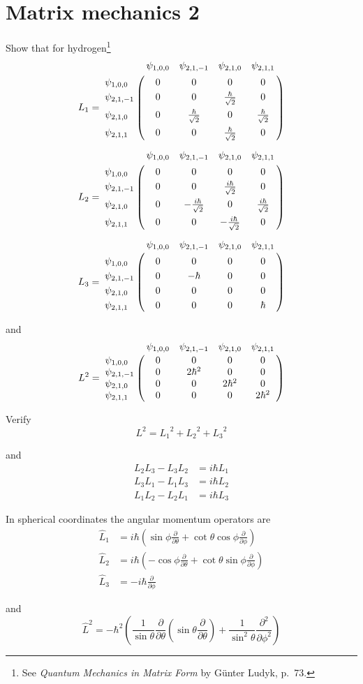 

\section*{Matrix mechanics 2}

Show that for hydrogen\footnote
{See {\it Quantum Mechanics in Matrix Form} by G\"unter Ludyk, p.~73.}
\begin{align*}
L_1&=
\bordermatrix{
& \psi_{1,0,0} & \psi_{2,1,-1} & \psi_{2,1,0} & \psi_{2,1,1} \cr
\psi_{1,0,0} & 0 & 0 & 0 & 0 \cr
\psi_{2,1,-1} & 0 & 0 & \frac{\hbar}{\sqrt2} & 0 \cr
\psi_{2,1,0} & 0 & \frac{\hbar}{\sqrt2} & 0 & \frac{\hbar}{\sqrt2} \cr
\psi_{2,1,1} & 0 & 0 & \frac{\hbar}{\sqrt2} & 0
}
\\[1ex]
L_2&=
\bordermatrix{
& \psi_{1,0,0} & \psi_{2,1,-1} & \psi_{2,1,0} & \psi_{2,1,1} \cr
\psi_{1,0,0} & 0 & 0 & 0 & 0 \cr
\psi_{2,1,-1} & 0 & 0 & \frac{i\hbar}{\sqrt2} & 0 \cr
\psi_{2,1,0} & 0 & -\frac{i\hbar}{\sqrt2} & 0 & \frac{i\hbar}{\sqrt2} \cr
\psi_{2,1,1} & 0 & 0 & -\frac{i\hbar}{\sqrt2} & 0
}
\\[1ex]
L_3&=
\bordermatrix{
& \psi_{1,0,0} & \psi_{2,1,-1} & \psi_{2,1,0} & \psi_{2,1,1} \cr
\psi_{1,0,0} & 0 & 0 & 0 & 0 \cr
\psi_{2,1,-1} & 0 & -\hbar & 0 & 0 \cr
\psi_{2,1,0} & 0 & 0 & 0 & 0 \cr
\psi_{2,1,1} & 0 & 0 & 0 & \hbar
}
\end{align*}

and
\begin{equation*}
L^2=
\bordermatrix{
& \psi_{1,0,0} & \psi_{2,1,-1} & \psi_{2,1,0} & \psi_{2,1,1} \cr
\psi_{1,0,0} & 0 & 0 & 0 & 0 \cr
\psi_{2,1,-1} & 0 & 2\hbar^2 & 0 & 0 \cr
\psi_{2,1,0} & 0 & 0 & 2\hbar^2 & 0 \cr
\psi_{2,1,1} & 0 & 0 & 0 & 2\hbar^2
}
\end{equation*}

Verify
\begin{equation*}
L^2={L_1}^2+{L_2}^2+{L_3}^2
\end{equation*}

and
\begin{align*}
L_2L_3-L_3L_2&=i\hbar L_1
\\
L_3L_1-L_1L_3&=i\hbar L_2
\\
L_1L_2-L_2L_1&=i\hbar L_3
\end{align*}

In spherical coordinates the angular momentum operators are
\begin{align*}
\hat L_1&=i\hbar\left(\sin\phi\frac{\partial}{\partial\theta}
+\cot\theta\cos\phi\frac{\partial}{\partial\phi}\right)
\\
\hat L_2&=i\hbar\left(-\cos\phi\frac{\partial}{\partial\theta}
+\cot\theta\sin\phi\frac{\partial}{\partial\phi}\right)
\\
\hat L_3&=-i\hbar\frac{\partial}{\partial\phi}
\end{align*}

and
\begin{equation*}
\hat L^2=-\hbar^2\left(\frac{1}{\sin\theta}\frac{\partial}{\partial\theta}
\left(\sin\theta\frac{\partial}{\partial\theta}\right)
+\frac{1}{\sin^2\theta}\frac{\partial^2}{\partial\phi^2}\right)
\end{equation*}


